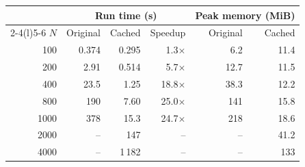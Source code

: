 \begin{tabular}{@{}r r r r r r@{}}
\toprule
& \multicolumn{3}{c}{Run time (s)} & \multicolumn{2}{c}{Peak memory (MiB)} \\
\cmidrule(lr){2-4}\cmidrule(l){5-6}
$N$ & Original & Cached & Speedup & Original & Cached \\
\midrule
100 & 0.374 & 0.295 & 1.3$\times$ & 6.2 & 11.4 \\
200 & 2.91 & 0.514 & 5.7$\times$ & 12.7 & 11.5 \\
400 & 23.5 & 1.25 & 18.8$\times$ & 38.3 & 12.2 \\
800 & 190 & 7.60 & 25.0$\times$ & 141 & 15.8 \\
1000 & 378 & 15.3 & 24.7$\times$ & 218 & 18.6 \\
2000 & -- & 147 & -- & -- & 41.2 \\
4000 & -- & 1\,182 & -- & -- & 133 \\
\bottomrule
\end{tabular}
